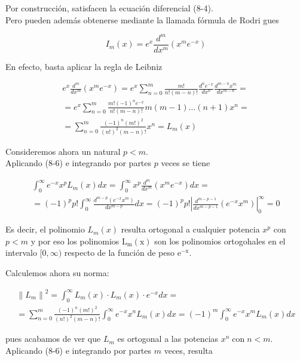 \documentclass[10pt]{article}
\theoremstyle{plain}
\theoremstyle{definition}
\theoremstyle{remark}
\begin{document}
Por construcción, satisfacen la ecuación diferencial (8-4).\\
Pero pueden además obtenerse mediante la llamada fórmula de Rodri gues


\begin{equation*}
I_{m}(x)=e^{x} \frac{d^{m}}{d x^{m}}\left(x^{m} e^{-x}\right) \tag{8-6}
\end{equation*}


En efecto, basta aplicar la regla de Leibniz

$$
\begin{gathered}
e^{x} \frac{d^{m}}{d x^{m}}\left(x^{m} e^{-x}\right)=e^{x} \sum_{n=0}^{m} \frac{m!}{n!(m-n)!} \frac{d^{n} e^{-x}}{d x^{n}} \frac{d^{m-n} x^{m}}{d x^{m-n}}= \\
=e^{x} \sum_{n=0}^{m} \frac{m!(-1)^{n} e^{-x}}{n!(m-n)!} m(m-1) \ldots(n+1) x^{n}= \\
=\sum_{n=0}^{m} \frac{(-1)^{n}(m!)^{2}}{(n!)^{2}(m-n)!} x^{n}=L_{m}(x)
\end{gathered}
$$

Consideremos ahora un natural $p<m$.\\
Aplicando (8-6) e integrando por partes $p$ veces se tiene

$$
\begin{gathered}
\int_{0}^{\infty} e^{-x} x^{p} L_{m}(x) d x=\int_{0}^{\infty} x^{p} \frac{d^{m}}{d x^{m}}\left(x^{m} e^{-x}\right) d x= \\
=(-1)^{p} p!\int_{0}^{\infty} \frac{d^{m-p}\left(e^{-x} x^{m}\right)}{d x^{m-p}} d x=(-1)^{p} p!\left|\frac{d^{m-p-1}}{d x^{m-p-1}}\left(e^{-x} x^{m}\right)\right|_{0}^{\infty}=0
\end{gathered}
$$

Es decir, el polinomio $L_{m}(x)$ resulta ortogonal a cualquier potencia $x^{p}$ con $p<m$ y por eso los polinomios $\mathrm{L}_{\mathrm{m}}(\mathrm{x})$ son los polinomios ortogohales en el intervalo $[0, \infty)$ respecto de la función de peso $\mathrm{e}^{-\mathrm{x}}$.

Calculemos ahora su norma:

$$
\begin{gathered}
\left\|L_{m}\right\|^{2}=\int_{0}^{\infty} L_{m}(x) \cdot L_{m}(x) \cdot e^{-x} d x= \\
=\sum_{n=0}^{m} \frac{(-1)^{n}(m!)^{2}}{(n!)^{2}(m-n)!} \int_{0}^{\infty} e^{-x} x^{n} L_{m}(x) d x=(-1)^{m} \int_{0}^{\infty} e^{-x} x^{m} L_{m}(x) d x
\end{gathered}
$$

pues acabamos de ver que $L_{m}$ es ortogonal a las potencias $x^{n} \operatorname{con} n<m$.\\
Aplicando (8-6) e integrando por partes $m$ veces, resulta
\end{document}
